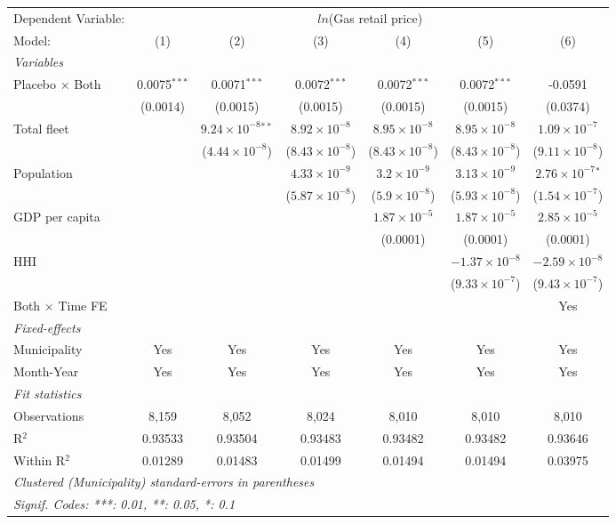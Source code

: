 \documentclass[
]{article}
\begin{document}
\begin{tabular}{lcccccc}
\tabularnewline\midrule\midrule
Dependent Variable:&\multicolumn{6}{c}{$ln$(Gas retail price)}\\
Model:&(1) & (2) & (3) & (4) & (5) & (6)\\
\midrule \emph{Variables}&   &   &   &   &   &  \\
Placebo $\times $ Both & 0.0075$^{***}$ & 0.0071$^{***}$ & 0.0072$^{***}$ & 0.0072$^{***}$ & 0.0072$^{***}$ & -0.0591\\
  &(0.0014) & (0.0015) & (0.0015) & (0.0015) & (0.0015) & (0.0374)\\
Total fleet &    & $9.24\times 10^{-8}$$^{**}$ & $8.92\times 10^{-8}$ & $8.95\times 10^{-8}$ & $8.95\times 10^{-8}$ & $1.09\times 10^{-7}$\\
  &   & ($4.44\times 10^{-8}$) & ($8.43\times 10^{-8}$) & ($8.43\times 10^{-8}$) & ($8.43\times 10^{-8}$) & ($9.11\times 10^{-8}$)\\
Population &    &    & $4.33\times 10^{-9}$ & $3.2\times 10^{-9}$ & $3.13\times 10^{-9}$ & $2.76\times 10^{-7}$$^{*}$\\
  &   &    & ($5.87\times 10^{-8}$) & ($5.9\times 10^{-8}$) & ($5.93\times 10^{-8}$) & ($1.54\times 10^{-7}$)\\
GDP per capita &    &    &    & $1.87\times 10^{-5}$ & $1.87\times 10^{-5}$ & $2.85\times 10^{-5}$\\
  &   &    &    & (0.0001) & (0.0001) & (0.0001)\\
HHI &    &    &    &    & $-1.37\times 10^{-8}$ & $-2.59\times 10^{-8}$\\
  &   &    &    &    & ($9.33\times 10^{-7}$) & ($9.43\times 10^{-7}$)\\
Both $\times$ Time FE &  &  &  &  &  & Yes\\
\midrule \emph{Fixed-effects}&   &   &   &   &   &  \\
Municipality & Yes & Yes & Yes & Yes & Yes & Yes\\
Month-Year & Yes & Yes & Yes & Yes & Yes & Yes\\
\midrule \emph{Fit statistics}&  & & & & & \\
Observations & 8,159&8,052&8,024&8,010&8,010&8,010\\
R$^2$ & 0.93533&0.93504&0.93483&0.93482&0.93482&0.93646\\
Within R$^2$ & 0.01289&0.01483&0.01499&0.01494&0.01494&0.03975\\
\midrule\midrule\multicolumn{7}{l}{\emph{Clustered (Municipality) standard-errors in parentheses}}\\
\multicolumn{7}{l}{\emph{Signif. Codes: ***: 0.01, **: 0.05, *: 0.1}}\\
\end{tabular}
\end{document}

